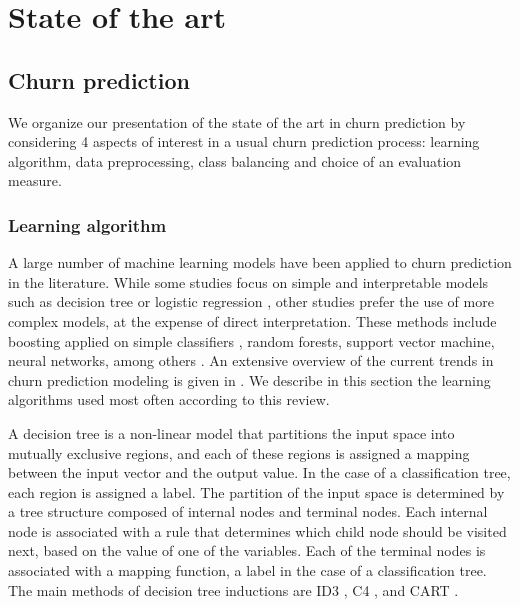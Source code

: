 \chapter{State of the art}
\label{ch:sota}

\section{Churn prediction}

We organize our presentation of the state of the art in churn prediction by
considering 4 aspects of interest in a usual churn prediction process: learning
algorithm, data preprocessing, class balancing and choice of an evaluation
measure.

\subsection{Learning algorithm}

A large number of machine learning models have been applied to churn prediction
in the literature. While some studies focus on simple and interpretable models
such as decision tree \parencite{keramati2014improved} or logistic regression
\parencite{olle2014hybrid}, other studies prefer the use of more complex models,
at the expense of direct interpretation. These methods include boosting applied
on simple classifiers \parencite{vafeiadis2015comparison}, random forests,
support vector machine, neural networks, among others
\parencite{umayaparvathi2016attribute, verbeke2012new}. An extensive overview of
the current trends in churn prediction modeling is given in
\parencite{kayaalp2017review}. We describe in this section the learning
algorithms used most often according to this review.

A decision tree is a non-linear model that partitions the input space into
mutually exclusive regions, and each of these regions is assigned a mapping
between the input vector and the output value. In the case of a classification
tree, each region is assigned a label. The partition of the input space is
determined by a tree structure composed of internal nodes and terminal nodes.
Each internal node is associated with a rule that determines which child node
should be visited next, based on the value of one of the variables. Each of the
terminal nodes is associated with a mapping function,  a label in the case of a
classification tree. The main methods of decision tree inductions are ID3
\parencite{quinlan1986induction}, C4 \parencite{quinlan1987simplifying}, and
CART \parencite{breiman1984classification}.


